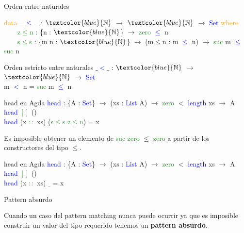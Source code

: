 \documentclass[xcolor=dvipsnames]{beamer} %
\newcommand{\cf}[1]{\textcolor{blue}{#1}}
\newcommand{\ct}[1]{\textcolor{blue}{#1}}
\newcommand{\cc}[1]{\textcolor{ForestGreen}{#1}}
\newcommand{\ck}[1]{\textcolor{orange}{#1}}
\newcommand{\N}{\ct{\mathbb{N}}}
\newcommand{\ra}{\rightarrow}
\begin{document}
\begin{frame}

\begin{block}{Orden entre naturales}

\ck{data} \ct{\_$\leq$\_} : $\N$ $\ra$ $\N$ $\ra$ \ct{Set} \ck{where}\\
\ \ \ \ \cc{z$\leq$n} : \{n : $\N$\}                 $\ra$ \cc{zero}  \ct{$\leq$} n\\
\ \ \ \ \cc{s$\leq$s} : \{m n : $\N$\} $\ra$ (m$\leq$n : m \ct{$\leq$} n) $\ra$ \cc{suc} m \ct{$\leq$} \cc{suc} n

\end{block}

\begin{block}{Orden estricto entre naturales}
\cf{$\_<\_$} : $\N$ $\ra$ $\N$ $\ra$ \ct{Set}\\
m \cf{$<$} n = \cc{suc} m \cf{$\leq$} n
\end{block}

\begin{block}{head en Agda}
    \cf{head} : \{A : \ct{Set}\}  $\ra$ (xs : \ct{List} A) $\ra$ 
    \cc{zero} $<$ \ct{length} xs $\rightarrow$ A \\
    \cf{head} \cc{$[]$} ()\\
    \cf{head} (x \cc{$::$} xs) (\cc{s$\leq$s} \cc{z$\leq$n}) = x
\end{block}  

\begin{block}{}
 Es imposible obtener un elemento de \cc{suc} \cc{zero} $\leq$ \cc{zero} a partir de los constructores
 del tipo $\leq$.
\end{block}


\end{frame}

\begin{frame}

  \begin{block}{head en Agda}
    \cf{head} : \{A : \ct{Set}\}  $\ra$ (xs : \ct{List} A) $\ra$ 
    \cc{zero} $<$ \ct{length} xs $\rightarrow$ A \\
    \cf{head} \cc{$[]$} ()\\
    \cf{head} (x \cc{$::$} xs) $\_$ = x
  \end{block}
  
\begin{block}{Pattern absurdo}

Cuando un caso del pattern matching nunca puede ocurrir ya que es imposible
construir un valor del tipo requerido tenemos un \textbf{pattern absurdo}.


\end{block}

\end{frame}
\end{document}
